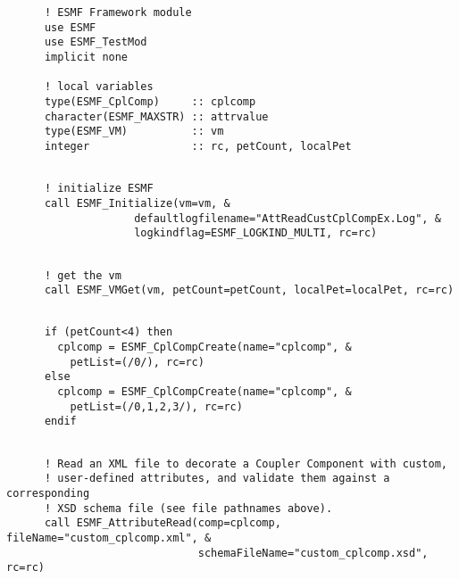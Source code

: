  \begin{verbatim}
      ! ESMF Framework module
      use ESMF
      use ESMF_TestMod
      implicit none

      ! local variables
      type(ESMF_CplComp)     :: cplcomp
      character(ESMF_MAXSTR) :: attrvalue
      type(ESMF_VM)          :: vm
      integer                :: rc, petCount, localPet
 
\end{verbatim}
 

 \begin{verbatim}
      ! initialize ESMF
      call ESMF_Initialize(vm=vm, &
                    defaultlogfilename="AttReadCustCplCompEx.Log", &
                    logkindflag=ESMF_LOGKIND_MULTI, rc=rc)
 
\end{verbatim}
 

 \begin{verbatim}
      ! get the vm
      call ESMF_VMGet(vm, petCount=petCount, localPet=localPet, rc=rc)
 
\end{verbatim}
 

 \begin{verbatim}
      if (petCount<4) then
        cplcomp = ESMF_CplCompCreate(name="cplcomp", &
          petList=(/0/), rc=rc)
      else
        cplcomp = ESMF_CplCompCreate(name="cplcomp", &
          petList=(/0,1,2,3/), rc=rc)
      endif
 
\end{verbatim}
 

 \begin{verbatim}
      ! Read an XML file to decorate a Coupler Component with custom,
      ! user-defined attributes, and validate them against a corresponding
      ! XSD schema file (see file pathnames above).
      call ESMF_AttributeRead(comp=cplcomp, fileName="custom_cplcomp.xml", &
                              schemaFileName="custom_cplcomp.xsd", rc=rc)
 
\end{verbatim}
 


